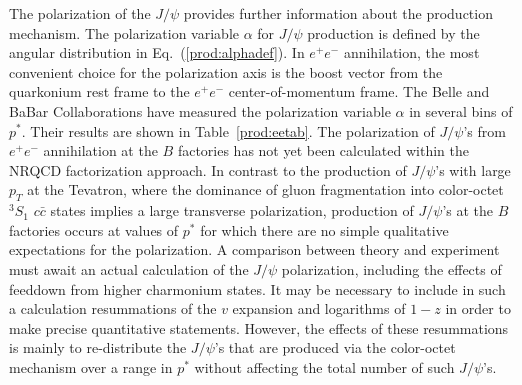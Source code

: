 The polarization of the $J/\psi$ provides further information about 
the production mechanism.  
The polarization variable $\alpha$ for $J/\psi$ production 
is defined by the angular distribution in Eq.~(\ref{prod:alphadef}).
In $e^+ e^-$ annihilation, the most convenient choice for the
polarization axis is the boost vector from the quarkonium rest frame 
to the $e^+ e^-$ center-of-momentum frame. 
The Belle and BaBar Collaborations have measured the polarization 
variable $\alpha$ in several bins of $p^*$. Their results are shown in
Table~\ref{prod:eetab}. The polarization of 
$J/\psi$'s from $e^+ e^-$ annihilation
at the $B$ factories has not yet been calculated within the NRQCD 
factorization approach. In contrast to the production of $J/\psi$'s 
with large $p_T$ at the Tevatron, 
where the dominance of gluon fragmentation into
color-octet ${}^3S_1$ $c \bar c$ states implies a large transverse
polarization, production of $J/\psi$'s at the $B$ factories occurs at
values of $p^*$ for which there are no simple qualitative expectations
for the polarization.  A comparison between  theory and experiment must
await an actual calculation of the $J/\psi$ polarization,
including the effects of feeddown from higher charmonium states. It may
be necessary to include in such a calculation resummations of the $v$
expansion and logarithms of $1-z$ in order to make precise quantitative
statements. However, the effects of these resummations is mainly to
re-distribute the $J/\psi$'s that are produced via the color-octet
mechanism over a range in $p^*$ without affecting the total number of
such $J/\psi$'s.


